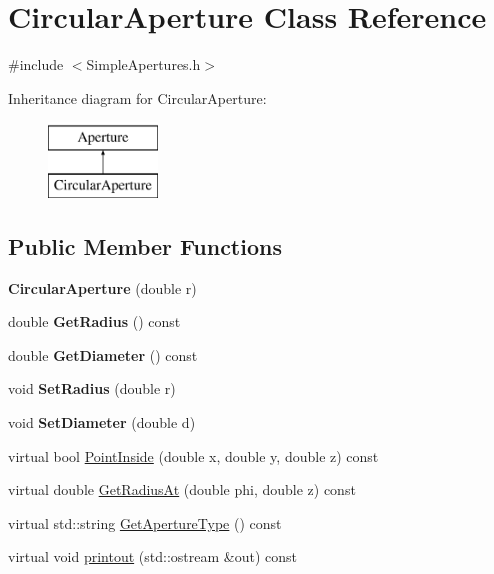 \hypertarget{classCircularAperture}{}\section{Circular\+Aperture Class Reference}
\label{classCircularAperture}


{\ttfamily \#include $<$Simple\+Apertures.\+h$>$}

Inheritance diagram for Circular\+Aperture\+:\begin{figure}[H]
\begin{center}
\leavevmode
\includegraphics[height=2.000000cm]{classCircularAperture}
\end{center}
\end{figure}
\subsection*{Public Member Functions}
\begin{DoxyCompactItemize}
\item 
\mbox{\label{classCircularAperture_ab762f5d7bdfd14133a3c638736842aae}} 
{\bfseries Circular\+Aperture} (double r)
\item 
\mbox{\label{classCircularAperture_aeb06ebc0f40d863ce9e8d062bf27e20f}} 
double {\bfseries Get\+Radius} () const
\item 
\mbox{\label{classCircularAperture_a8b4384aa00bc5da6c88b7f0132554e19}} 
double {\bfseries Get\+Diameter} () const
\item 
\mbox{\label{classCircularAperture_a4702c029c5be632e94301bb76a99a428}} 
void {\bfseries Set\+Radius} (double r)
\item 
\mbox{\label{classCircularAperture_a952ec2c24dec60e01e8efec258b979f5}} 
void {\bfseries Set\+Diameter} (double d)
\item 
virtual bool \hyperlink{classCircularAperture_a1cc2c7d1ff491dbfb0c24790897d4519}{Point\+Inside} (double x, double y, double z) const
\item 
virtual double \hyperlink{classCircularAperture_ab2f83be4d78bb1495b2b0aebef78e189}{Get\+Radius\+At} (double phi, double z) const
\item 
virtual std\+::string \hyperlink{classCircularAperture_a18f05ba1dde35881014ba3aa2ed693bc}{Get\+Aperture\+Type} () const
\item 
virtual void \hyperlink{classCircularAperture_af7380933fd3494dd0d1868b655a78b08}{printout} (std\+::ostream \&out) const
\end{DoxyCompactItemize}
